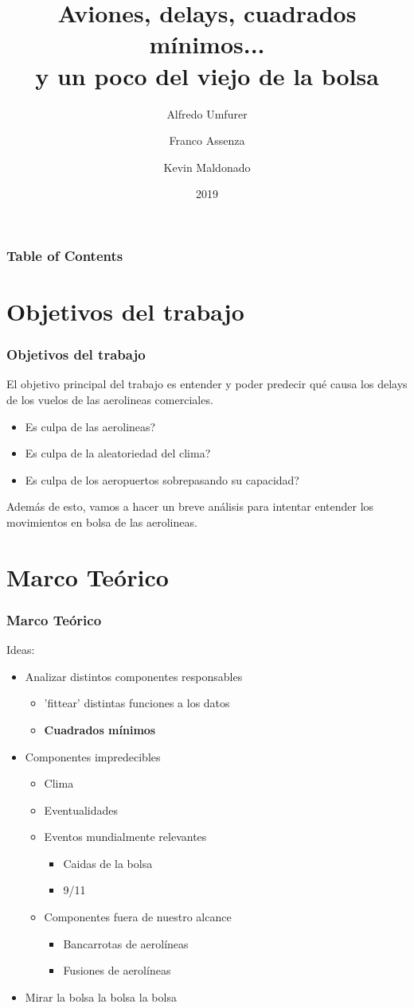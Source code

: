 \documentclass{beamer}
\title{Aviones, delays, cuadrados mínimos...\\ y un poco del viejo de la bolsa}
\author[]{Alfredo Umfurer \and Franco Assenza \and Kevin Maldonado}
\institute{Universidad de Buenos Aires}
\date{2019}
\begin{document}
\frame{\titlepage}

\begin{frame}
\frametitle{Table of Contents}
\tableofcontents
\end{frame}
  
\section{Objetivos del trabajo}  
\begin{frame}
\frametitle{Objetivos del trabajo}
El objetivo principal del trabajo es entender y poder predecir qué causa los delays de los vuelos de las aerolineas comerciales.\\
\begin{itemize}
\item<2-> Es culpa de las aerolineas?
\item<3-> Es culpa de la aleatoriedad del clima?
\item<4-> Es culpa de los aeropuertos sobrepasando su capacidad?
\end{itemize}
Además de esto, vamos a hacer un breve análisis para intentar entender los movimientos en bolsa de las aerolineas.
\end{frame}
 
\section{Marco Teórico}
\begin{frame}
\frametitle{Marco Teórico}

Ideas:
\begin{itemize}
\item<2-> Analizar distintos componentes responsables
\begin{itemize}
\item<3-> 'fittear' distintas funciones a los datos
\item<4-> \textbf{Cuadrados mínimos}
\end{itemize}
\item<5-> Componentes impredecibles
\begin{itemize}
\item<5-> Clima
\item<5-> Eventualidades
\item<5-> Eventos mundialmente relevantes
\begin{itemize}
\item<6-> Caidas de la bolsa
\item<6-> 9/11
\end{itemize}
\item<7-> Componentes fuera de nuestro alcance
\begin{itemize}
\item<7-> Bancarrotas de aerolíneas
\item<7-> Fusiones de aerolíneas
\end{itemize}

\end{itemize}
\item<8-> Mirar la bolsa la bolsa la bolsa
\end{itemize}


\end{frame}
\end{document}
